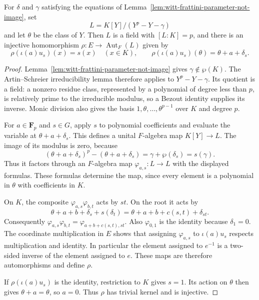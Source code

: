 \begin{lemma}
\label{lem:witt-lifted-automorphisms}
\leanok
For $\delta$ and $\gamma$ satisfying the equations of
Lemma~\ref{lem:witt-frattini-parameter-not-image}, set
\[
 L=K[Y]/(Y^p-Y-\gamma)
\]
and let $\theta$ be the class of $Y$.
Then $L$ is a field with $[L:K]=p$, and there is an injective
homomorphism $\rho:E\to\operatorname{Aut}_F(L)$ given by
\[
 \rho(\iota(a)u_s)(x)=s(x)\quad(x\in K),\qquad
 \rho(\iota(a)u_s)(\theta)=\theta+a+\delta_s.
\]
\end{lemma}

\begin{proof}
Lemma~\ref{lem:witt-frattini-parameter-not-image} gives
$\gamma\notin\wp(K)$.
The Artin--Schreier irreducibility lemma therefore applies to
$Y^p-Y-\gamma$. Its quotient is a field: a nonzero residue
class, represented by a polynomial of degree less than $p$,
is relatively prime to the irreducible modulus, so a Bezout
identity supplies its inverse. Monic division also gives the
basis $1,\theta,\ldots,\theta^{p-1}$ over $K$ and degree $p$.

For $a\in\mathbf F_p$ and $s\in G$, apply $s$ to polynomial
coefficients and evaluate the variable at $\theta+a+\delta_s$.
This defines a unital $F$-algebra map $K[Y]\to L$.
The image of its modulus is zero, because
\[
 (\theta+a+\delta_s)^p-(\theta+a+\delta_s)
   =\gamma+\wp(\delta_s)=s(\gamma).
\]
Thus it factors through an $F$-algebra map $\varphi_{a,s}:L\to L$
with the displayed formulas. These formulas determine the map,
since every element is a polynomial in $\theta$ with
coefficients in $K$.

On $K$, the composite $\varphi_{a,s}\varphi_{b,t}$ acts by $st$.
On the root it acts by
\[
 \theta+a+b+\delta_s+s(\delta_t)
   =\theta+a+b+c(s,t)+\delta_{st}.
\]
Consequently
$\varphi_{a,s}\varphi_{b,t}
 =\varphi_{a+b+c(s,t),st}$.
Also $\varphi_{0,1}$ is the identity because $\delta_1=0$.
The coordinate multiplication in $E$ shows that assigning
$\varphi_{a,s}$ to $\iota(a)u_s$ respects multiplication and
identity. In particular the element assigned to $e^{-1}$
is a two-sided inverse of the element assigned to $e$.
These maps are therefore automorphisms and define $\rho$.

If $\rho(\iota(a)u_s)$ is the identity, restriction to $K$
gives $s=1$. Its action on $\theta$ then gives
$\theta+a=\theta$, so $a=0$. Thus $\rho$ has trivial kernel
and is injective.
\end{proof}

